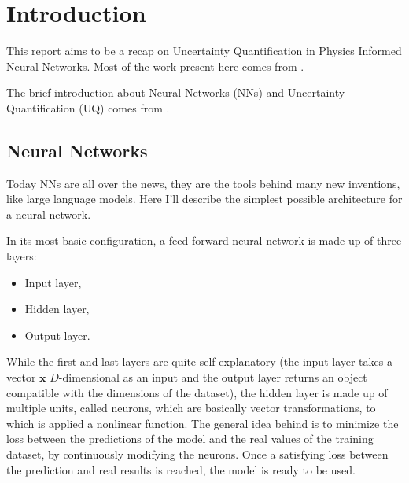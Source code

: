 \documentclass[11pt,a4paper]{article}
\begin{document}



\section{Introduction}

This report aims to be a recap on Uncertainty Quantification in Physics Informed Neural Networks. Most of the work present here comes from \cite{Zhang_2019}.

The brief introduction about Neural Networks (NNs) and Uncertainty Quantification (UQ) comes from \cite{Abdar_2021}.
\subsection{Neural Networks}
Today NNs are all over the news, they are the tools behind many new inventions, like large language models. Here I'll describe the simplest possible architecture for a neural network. 

In its most basic configuration, a feed-forward neural network is made up of three layers:
\begin{itemize}
    \item Input layer,
    \item Hidden layer,
    \item Output layer.
\end{itemize}
While the first and last layers are quite self-explanatory (the input layer takes a vector \(\bm{x}\) \(D\)-dimensional as an input and the output layer returns an object compatible with the dimensions of the dataset), the hidden layer is made up of multiple units, called neurons, which are basically vector transformations, to which is applied a nonlinear function. The general idea behind is to minimize the loss between the predictions of the model and the real values of the training dataset, by continuously modifying the neurons. Once a satisfying loss between the prediction and real results is reached, the model is ready to be used. 
\end{document}
